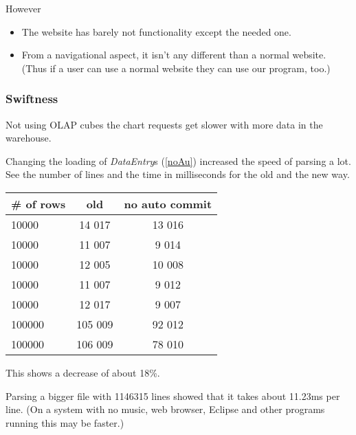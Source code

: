 However
\begin{itemize}
	\item The website has barely not functionality except the needed one.
	\item From a navigational aspect, it isn't any different than a normal website. (Thus if a user can use a normal website they can use our program, too.)
\end{itemize}


\pagebreak[4]
\subsubsection{Swiftness}
Not using OLAP cubes the chart requests get slower with more data in the warehouse. %

Changing the loading of \textit{DataEntry}s (\ref{noAu}) increased
the speed of parsing a lot. See the number of lines and the time in milliseconds
for the old and the new way.

\begin{tabular}{l|c|c}
\# of rows & old & no auto commit \\
\hline
10000& 14 017 & 13 016\\
10000&11 007 &9 014\\
10000&12 005&10 008\\
10000&11 007&9 012\\
10000&12 017&9 007\\
100000&105 009 &92 012\\
100000&106 009 &78 010\\
\end{tabular}

This shows a decrease of about 18\%.

Parsing a bigger file with 1146315 lines showed
that it takes about 11.23ms per line. (On a system with no music, web browser,
Eclipse and other programs running this may be faster.)
